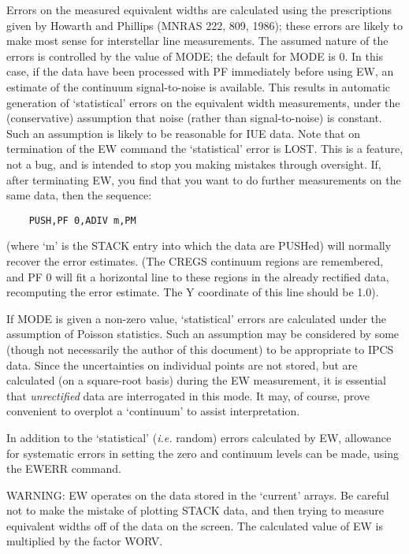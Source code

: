 \begin {description}
Errors on the measured equivalent widths are calculated using the
prescriptions given by Howarth and Phillips (MNRAS 222, 809, 1986);
these errors are likely to make most sense for interstellar line
measurements. The assumed nature of the errors is controlled by the
value of MODE;  the default for MODE is 0. In this case, if the data
have been processed with PF immediately before using EW, an estimate
of the continuum signal-to-noise is available. This results in
automatic generation of `statistical' errors on the equivalent width
measurements, under the (conservative) assumption that noise (rather
than signal-to-noise) is constant. Such an assumption is likely to be
reasonable for IUE data. Note that on termination of the EW command
the `statistical' error is LOST. This is a feature, not a bug, and is
intended to stop you making mistakes through oversight. If, after
terminating EW, you find that you want to do further measurements on
the same data, then the sequence: 

\begin{verbatim} 
    PUSH,PF 0,ADIV m,PM
\end{verbatim} 

(where `m' is the STACK entry into which the data are PUSHed) will
normally recover the error estimates. (The CREGS continuum regions are
remembered, and PF 0 will fit a horizontal line to these regions in
the already rectified data, recomputing the error estimate. The Y
coordinate of this line should be 1.0).

If MODE is given a non-zero value, `statistical' errors are calculated
under the assumption of Poisson statistics. Such an assumption may be
considered by some (though not necessarily the author of this
document) to be appropriate to IPCS data. Since the uncertainties on
individual points are not stored, but are calculated (on a square-root
basis) during the EW measurement, it is essential that {\em
unrectified} data are interrogated in this mode. It may, of course,
prove convenient to overplot a `continuum' to assist interpretation.

In addition to the `statistical' ({\em i.e.} random) errors calculated
by EW, allowance for systematic errors in setting the zero and
continuum levels can be made, using the EWERR command.

WARNING: EW operates on the data stored in the `current' arrays. Be
careful not to make the mistake of plotting STACK data, and then
trying to measure equivalent widths off of the data on the screen. The
calculated value of EW is multiplied by the factor WORV.


\end{description}
